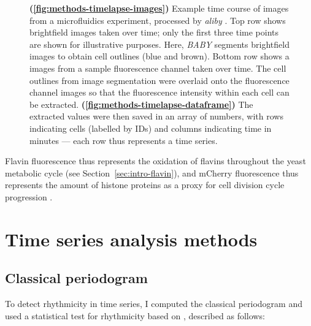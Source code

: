 \begin{figure}[hp]
  \caption[
    Example time course of images from a microfluidics experiment, processed by \textit{aliby}.
    The extracted values were then saved in an array of numbers, with rows indicating cells (labelled by IDs) and columns indicating time in minutes --- each row thus represents a time series.
  ]{
    \textbf{(\ref{fig:methods-timelapse-images})}
    Example time course of images from a microfluidics experiment, processed by \textit{aliby} \parencite{munozgonzalezPhenotypingSingleCells2023}.
    Top row shows brightfield images taken over time; only the first three time points are shown for illustrative purposes.
    Here, \textit{BABY} \parencite{pietschDeterminingGrowthRates2023} segments brightfield images to obtain cell outlines (blue and brown).
    Bottom row shows a images from a sample fluorescence channel taken over time.
    The cell outlines from image segmentation were overlaid onto the fluorescence channel images so that the fluorescence intensity within each cell can be extracted.
    \textbf{(\ref{fig:methods-timelapse-dataframe})}
    The extracted values were then saved in an array of numbers, with rows indicating cells (labelled by IDs) and columns indicating time in minutes --- each row thus represents a time series.
  }
  \label{fig:methods-timelapse}
\end{figure}

Flavin fluorescence thus represents the oxidation of flavins throughout the yeast metabolic cycle (see Section~\ref{sec:intro-flavin}), and mCherry fluorescence thus represents the amount of histone proteins as a proxy for cell division cycle progression \parencite{garmendia-torresMultipleInputsEnsure2018}.


\section{Time series analysis methods}
\label{sec:methods-computational}

\subsection{Classical periodogram}
\label{subsec:methods-computational-periodogram}

To detect rhythmicity in time series, I computed the classical periodogram and used a statistical test for rhythmicity based on \textcite{glynnDetectingPeriodicPatterns2006}, described as follows:

